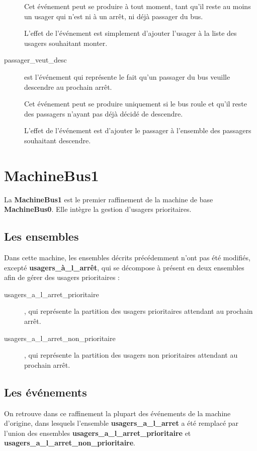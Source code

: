 \documentclass[a4paper,titlepage]{report}
\begin{document}
\begin{description}
			Cet événement peut se produire à tout moment, tant qu'il reste au moins un usager qui n'est ni à un arrêt, ni déjà passager du bus.
			
			L'effet de l'événement est simplement d'ajouter l'usager à la liste des usagers souhaitant monter.\\
			
			\item[passager\_veut\_desc] est l'événement qui représente le fait qu'un passager du bus veuille descendre au prochain arrêt.
			
			Cet événement peut se produire uniquement si le bus roule et qu'il reste des passagers n'ayant pas déjà décidé de descendre.
			
			L'effet de l'événement est d'ajouter le passager à l'ensemble des passagers souhaitant descendre.\\
		\end{description}
		
\section{MachineBus1}
	La \textbf{MachineBus1} est le premier raffinement de la machine de base \textbf{MachineBus0}. Elle intègre la gestion d'usagers prioritaires.\\
		
	\subsection{Les ensembles}
		Dans cette machine, les ensembles décrits précédemment n'ont pas été modifiés, excepté \textbf{usagers\_à\_l\_arrêt}, qui se décompose à présent en deux ensembles afin de gérer des usagers prioritaires :
		 	
		\begin{description}
			\item[usagers\_a\_l\_arret\_prioritaire], qui représente la partition des usagers prioritaires attendant au prochain arrêt.
			\item[usagers\_a\_l\_arret\_non\_prioritaire], qui représente la partition des usagers non prioritaires attendant au prochain arrêt.\\
		\end{description}
				
	\subsection{Les événements}
		On retrouve dans ce raffinement la plupart des événements de la machine d'origine, dans lesquels l'ensemble \textbf{usagers\_a\_l\_arret} a été remplacé par l'union des ensembles \textbf{usagers\_a\_l\_arret\_prioritaire} et \textbf{usagers\_a\_l\_arret\_non\_prioritaire}.\\
		
\end{document}
